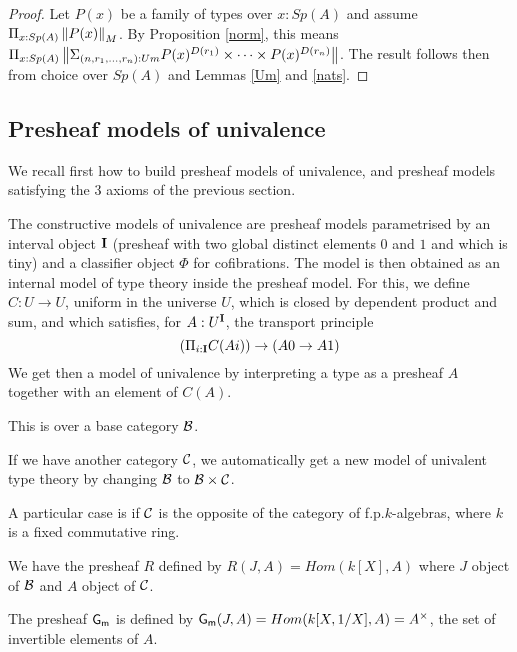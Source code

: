    \begin{proof}
      Let $P(x)$ be a family of types over $x:Sp(A)$ and assume $\Pi_{x:Sp(A)}\left\lVert P(x) \right\rVert_M$. By Proposition \ref{norm},
      this means $\Pi_{x:Sp(A)}\left\lVert \Sigma_{(n,r_1,\dots,r_n):Um}P(x)^{D(r_1)}\times\dots\times P(x)^{D(r_n)} \right\rVert$. The result follows
      then from choice over $Sp(A)$ and Lemmas \ref{Um} and \ref{nats}.
    \end{proof}      


    \subsection{Presheaf models of univalence}

    We recall first how to build presheaf models of univalence, and presheaf models satisfying the 3 axioms of the previous section.

The constructive models of univalence are presheaf models parametrised by an interval object $\mathbf{I}$
(presheaf with two global distinct elements $0$ and $1$ and which is tiny) and a classifier object
$\Phi$ for cofibrations. The model is then obtained as an internal model of type theory inside the
presheaf model. For this, we define $C:U\rightarrow U$, uniform in the universe $U$,
which is closed by dependent product and sum, and which satisfies, for $A:U^{\mathbf{I}}$, the transport principle
$$
(\Pi_{i:\mathbf{I}}C(Ai))\rightarrow (A0\rightarrow A1)
$$
We get then a model of univalence by interpreting a type as a presheaf $A$ together with an element
of $C(A)$.


 This is over a base category $\mathcal{B}$.
 
 If we have another category $\mathcal{C}$, we automatically get a new model of univalent type theory by
 changing $\mathcal{B}$ to $\mathcal{B}\times\mathcal{C}$.

 A particular case is if $\mathcal{C}$ is the opposite of the category of f.p.\@ $k$-algebras, where $k$ is a
 fixed commutative ring.

 We have the presheaf $R$ defined by $R(J,A) = Hom(k[X],A)$ where $J$ object of $\mathcal{B}$ and $A$ object of $\mathcal{C}$.

  The presheaf $\mathsf{G_m}$ is defined by $\mathsf{G_m}(J,A) = Hom(k[X,1/X],A) = A^{\times}$, the set of invertible elements of $A$.

